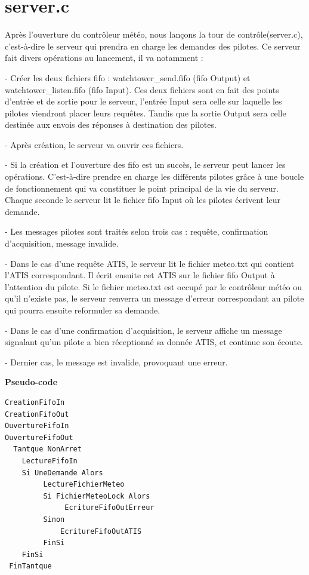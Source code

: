 \documentclass{report}
\begin{document}
{	\section{server.c}

		Après l'ouverture du contrôleur météo, nous lançons la tour de contrôle(server.c), c'est-à-dire le serveur qui prendra en charge les demandes des pilotes.
		Ce serveur fait divers opérations au lancement, il va notamment : 

		- Créer les deux fichiers fifo : watchtower\_send.fifo (fifo Output) et watchtower\_listen.fifo (fifo Input).
		Ces deux fichiers sont en fait des points d'entrée et de sortie pour le serveur, l'entrée Input sera celle sur laquelle les pilotes viendront placer leurs requêtes.
		Tandis que la sortie Output sera celle destinée aux envois des réponses à destination des pilotes.

		- Après création, le serveur va ouvrir ces fichiers.

		- Si la création et l'ouverture des fifo est un succès, le serveur peut lancer les opérations. C'est-à-dire prendre en charge les différents pilotes grâce à une boucle de fonctionnement qui va constituer le point principal de la vie du serveur.
		Chaque seconde le serveur lit le fichier fifo Input où les pilotes écrivent leur demande.

		- Les messages pilotes sont traités selon trois cas : requête, confirmation d'acquisition, message invalide.

		- Dans le cas d'une requête ATIS, le serveur lit le fichier meteo.txt qui contient l'ATIS correspondant. Il écrit ensuite cet ATIS sur le fichier fifo Output à l'attention du pilote. 
		Si le fichier meteo.txt est occupé par le contrôleur météo ou qu'il n'existe pas, le serveur renverra un message d'erreur correspondant au pilote qui pourra ensuite reformuler sa demande.

		- Dans le cas d'une confirmation d’acquisition, le serveur affiche un message signalant qu'un pilote a bien réceptionné sa donnée ATIS, et continue son écoute.

		- Dernier cas, le message est invalide, provoquant une erreur.
  \newline
	
 \textbf{Pseudo-code}

 \begin{lstlisting}[language=C]
CreationFifoIn
CreationFifoOut
OuvertureFifoIn
OuvertureFifoOut
  Tantque NonArret
	LectureFifoIn
	Si UneDemande Alors 
		 LectureFichierMeteo
		 Si FichierMeteoLock Alors
		 	  EcritureFifoOutErreur
		 Sinon
			 EcritureFifoOutATIS
		 FinSi
	FinSi
 FinTantque 
  \end{lstlisting}

}
\end{document}
